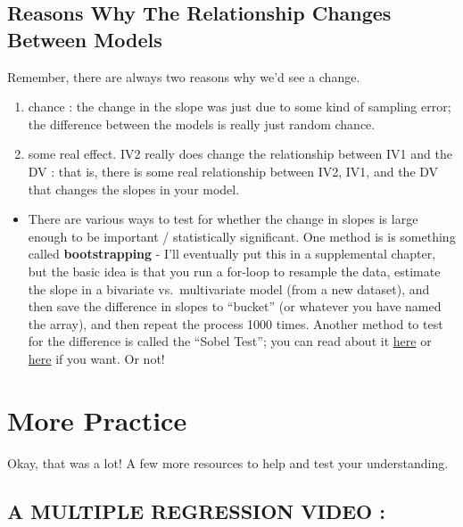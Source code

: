 \documentclass[
  letterpaper,
  DIV=11,
  numbers=noendperiod,
  oneside]{scrreprt}
\providecommand{\tightlist}{%
  \setlength{\itemsep}{0pt}\setlength{\parskip}{0pt}}\usepackage{longtable,booktabs,array}
\begin{document}
\subsection{Reasons Why The Relationship Changes Between
Models}\label{reasons-why-the-relationship-changes-between-models}

Remember, there are always two reasons why we'd see a change.

\begin{enumerate}
\def\labelenumi{\arabic{enumi}.}
\item
  chance : the change in the slope was just due to some kind of sampling
  error; the difference between the models is really just random chance.
\item
  some real effect. IV2 really does change the relationship between IV1
  and the DV : that is, there is some real relationship between IV2,
  IV1, and the DV that changes the slopes in your model.
\end{enumerate}

\begin{itemize}
\tightlist
\item
  There are various ways to test for whether the change in slopes is
  large enough to be important / statistically significant. One method
  is is something called \textbf{bootstrapping} - I'll eventually put
  this in a supplemental chapter, but the basic idea is that you run a
  for-loop to resample the data, estimate the slope in a bivariate
  vs.~multivariate model (from a new dataset), and then save the
  difference in slopes to ``bucket'' (or whatever you have named the
  array), and then repeat the process 1000 times. Another method to test
  for the difference is called the ``Sobel Test''; you can read about it
  \href{http://quantpsy.org/sobel/sobel.htm}{here} or
  \href{https://en.wikipedia.org/wiki/Sobel_test}{here} if you want. Or
  not!
\end{itemize}

\section{More Practice}\label{more-practice}

Okay, that was a lot! A few more resources to help and test your
understanding.

\subsection{\texorpdfstring{\textbf{A MULTIPLE REGRESSION VIDEO
:}}{A MULTIPLE REGRESSION VIDEO :}}\label{a-multiple-regression-video}
\end{document}
